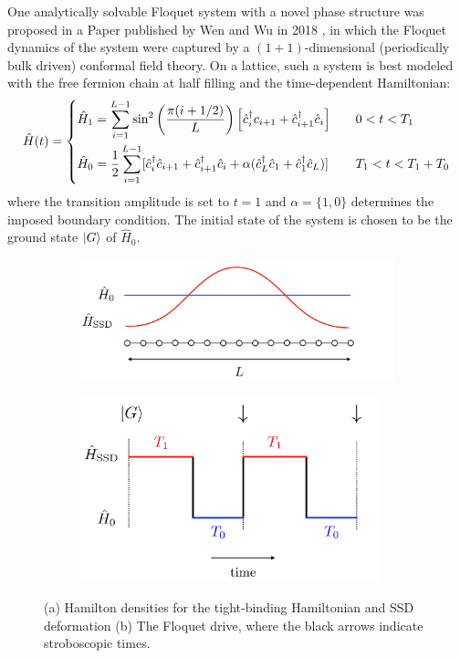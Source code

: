 \documentclass[11pt, a4paper, oneside]{book}
\theoremstyle{definition} %
\begin{document}
 One analytically solvable Floquet system with a novel phase structure was proposed in a Paper published by Wen and Wu in 2018 \cite{Xueda}, in which the Floquet dynamics of the system were captured by a $(1+1)$-dimensional (periodically bulk driven) conformal field theory. On a lattice, such a system is best modeled with the free fermion chain at half filling and the time-dependent Hamiltonian:
	\begin{equation}
	\hat{H}(t) = 
		\begin{dcases}
		\hat{H}_\text{1} = \sum_{i=1}^{L-1} \sin^2\left( \frac{\pi(i + 1/2)}{L}\right) \left[ \hat{c}_i^\dagger c_{i+1} + \hat{c}_{i+1}^\dagger \hat{c}_i \right] \quad &0<t< T_1 \\
		\hat{H}_0 = \frac{1}{2} \sum_{i=1}^{L-1} [\hat{c}_i^\dagger \hat{c}_{i+1} + \hat{c}_{i+1}^\dagger \hat{c}_{i} + \alpha ( \hat{c}_{L}^\dagger \hat{c}_1 + \hat{c}_1^\dagger \hat{c}_L)]  &T_1 < t < T_1 + T_0
		\end{dcases}
		\label{eq:Floquet_Hamiltonian1d}
	\end{equation}
where the transition amplitude is set to $t=1$ and $\alpha = \{1,0\}$ determines the imposed boundary condition. The initial state of the system is chosen to be the ground state $\ket{G}$ of $\hat{H}_0$.
\begin{figure}[h]
\centering
		\begin{subfigure}[b]{0.45\textwidth}
			\includegraphics[width=\textwidth]{Floquet_Drive1D_Deformation.pdf}
			\caption{}
		\end{subfigure}
		\begin{subfigure}[b]{0.45\textwidth}
			\includegraphics[width=0.95\textwidth]{Floquet_Drive.pdf}
			\caption{}
		\end{subfigure}
		\caption{(a) Hamilton densities for the tight-binding Hamiltonian and SSD deformation (b) The Floquet drive, where the black arrows indicate stroboscopic times.}
		\label{fig:Floquet_system_1d}
\end{figure}
\end{document}
